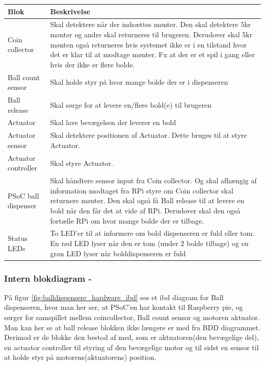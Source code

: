 \documentclass[Arkitektur/System_main.tex]{subfiles}
\begin{document}
\begin{table}[H]
\begin{tabular}{L{0.2\columnwidth}|L{0.8\columnwidth}}
\hline
\textbf{Blok} & \textbf{Beskrivelse} \\ \hline

Coin collector & Skal detektere når der indsættes mønter. Den skal detektere 5kr mønter og andre skal returneres til brugeren. Derudover skal 5kr mønten også returneres hvis systemet ikke er i en tilstand hvor det er klar til at modtage mønter. Fx at der er et spil i gang eller hvis der ikke er flere bolde.\\ \hline
Ball count sensor & Skal holde styr på hvor mange bolde der er i dispenseren\\ \hline
Ball release & Skal sørge for at levere en/flere bold(e) til brugeren\\ \hline
Actuator & Skal lave bevægelsen der leverer en bold \\ \hline
Actuator sensor & Skal detektere positionen af Actuator. Dette bruges til at styre Actuator.\\ \hline
Actuator controller & Skal styre Actuator.\\ \hline
PSoC ball dispenser & Skal håndtere sensor input fra Coin collector. Og skal afhængig af information modtaget fra RPi styre om Coin collector skal returnere mønter. Den skal også få Ball release til at levere en bold når den får det at vide af RPi. Derudover skal den også fortælle RPi om hvor mange bolde der er tilbage. \\ \hline
Status LEDs & To LED'er til at informere om bold dispenseren er fuld eller tom. En rød LED lyser når den er tom (under 2 bolde tilbage) og en grøn LED lyser når bolddispenseren er fuld\\ \hline
\end{tabular}
\end{table}

\subsubsection{Intern blokdiagram - }

På figur \ref{fig:balldispensere_hardware_ibd} ses et ibd diagram for Ball dispenseren, hvor man her ser, at PSoC'en har kontakt til Raspberry pie, og sørger for samspillet mellem coincollector, Ball count sensor og motoren aktuator. Man kan her se at ball release blokken ikke længere er med fra BDD diagrammet. Derimod er de blokke den bestod af med, som er aktuatoren(den bevægelige del), en actuator controller til styring af den bevægelige motor og til sidst en sensor til at holde styr på motorens(aktuatorens) position.
\end{document}
